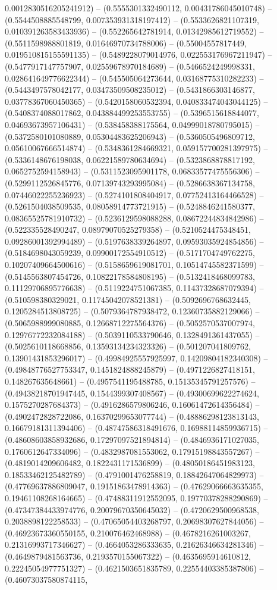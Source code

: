 0.0012830516205241912) -- (0.5555301332490112, 0.00431786045010748) -- (0.5544508885548799, 0.007353931318197412) -- (0.5533626821107319, 0.010391263583433936) -- (0.552265642781914, 0.01342985612719552) -- (0.5511598988801819, 0.01646970734788006) -- (0.55004557817449, 0.019510815155591135) -- (0.5489228079014976, 0.022553176967211947) -- (0.5477917147757907, 0.02559678970184689) -- (0.5466524249998331, 0.028641649776622344) -- (0.545505064273644, 0.03168775310282233) -- (0.5443497578042177, 0.03473509508235012) -- (0.5431866303146877, 0.03778367060450365) -- (0.5420158060532394, 0.040833474043044125) -- (0.5408374088017862, 0.043884499253553755) -- (0.5396515618844077, 0.04693673957106431) -- (0.538458388175564, 0.04999018780795015) -- (0.5372580101080889, 0.05304483625206943) -- (0.5360505496809712, 0.05610067666514874) -- (0.5348361284669321, 0.059157700281397975) -- (0.5336148676198038, 0.06221589780634694) -- (0.5323868878817192, 0.0652752594158943) -- (0.5311523095901178, 0.06833577475556306) -- (0.5299112526845776, 0.07139743293995084) -- (0.5286638367134758, 0.07446022255236923) -- (0.5274101808404917, 0.07752413164466528) -- (0.5261504038509535, 0.08058914773721915) -- (0.5248846241580377, 0.08365525781910732) -- (0.5236129598088288, 0.08672244834842986) -- (0.522335528490247, 0.08979070525279358) -- (0.5210524475348451, 0.09286001392994489) -- (0.5197638339264897, 0.09593035924854856) -- (0.5184698043059239, 0.09900172554910512) -- (0.5171704749762275, 0.10207409664500616) -- (0.5158659619081701, 0.10514745582371599) -- (0.5145563807454726, 0.10822178584808195) -- (0.5132418468099783, 0.11129706895776638) -- (0.5119224751067385, 0.11437328687079394) -- (0.510598380329021, 0.11745042078521381) -- (0.5092696768632445, 0.1205284513808725) -- (0.5079364787938472, 0.12360735882129066) -- (0.5065988999080885, 0.12668712275564376) -- (0.5052570537007974, 0.12976772232084188) -- (0.5039110533790646, 0.1328491361437055) -- (0.5025610118668856, 0.13593134234323326) -- (0.501207041809762, 0.13901431853296017) -- (0.49984925557925997, 0.14209804182340308) -- (0.49848776527753347, 0.1451824888245879) -- (0.4971226827418151, 0.148267635648661) -- (0.4957541195488785, 0.15135345791257576) -- (0.49438218701947445, 0.1544399307408567) -- (0.49300699622274624, 0.1575270287684373) -- (0.4916286579806246, 0.16061472614356484) -- (0.4902472828722086, 0.16370299653077744) -- (0.48886298123813143, 0.16679181311394406) -- (0.48747586318491676, 0.16988114859936715) -- (0.48608603858932686, 0.17297097521894814) -- (0.4846936171027035, 0.1760612647334096) -- (0.4832987081553062, 0.17915198843557267) -- (0.4819014209606482, 0.1822431171536899) -- (0.48050186451983123, 0.18533462125482789) -- (0.4791001476258819, 0.18842647064829973) -- (0.47769637886809047, 0.19151863478914363) -- (0.47629066663635355, 0.19461108268164665) -- (0.47488311912552095, 0.19770378288290869) -- (0.47347384433974776, 0.20079670350645032) -- (0.4720629500968538, 0.2038898122258533) -- (0.47065054403268797, 0.20698307627844056) -- (0.46923673360550155, 0.210076462468988) -- (0.4678216261003267, 0.21316993717346627) -- (0.4664053286333635, 0.21626346634281346) -- (0.4649879481563736, 0.2193570155067322) -- (0.4635695914610812, 0.22245054977751327) -- (0.4621503651835789, 0.22554403385387806) -- (0.46073037580874115, 